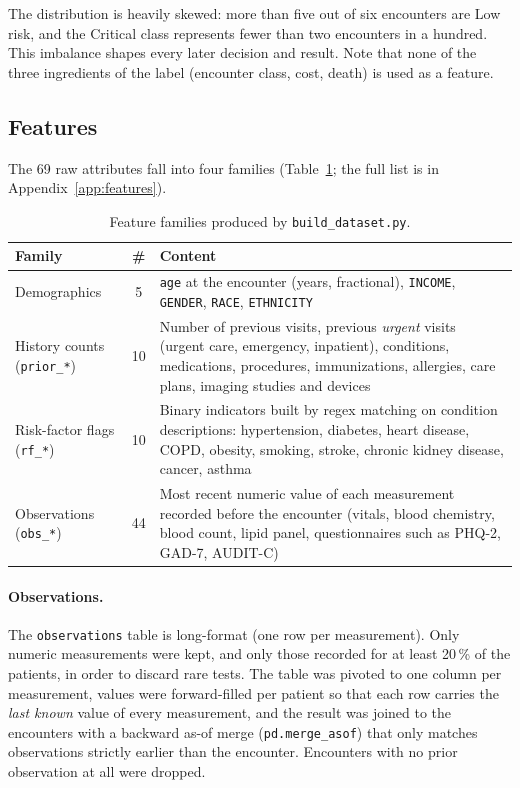 \documentclass[11pt,a4paper]{article}
\newcommand{\code}[1]{\texttt{\textcolor{codegrey}{#1}}}
\begin{document}
The distribution is heavily skewed: more than five out of six encounters are Low risk, and the
Critical class represents fewer than two encounters in a hundred. This imbalance shapes every later
decision and result. Note that none of the three ingredients of the label (encounter class, cost,
death) is used as a feature.

\subsection{Features}

The 69 raw attributes fall into four families (Table~\ref{tab:features}; the full list is in
Appendix~\ref{app:features}).

\begin{table}[H]
\centering\small
\caption{Feature families produced by \code{build\_dataset.py}.}
\label{tab:features}
\begin{tabular}{@{}lcp{8.6cm}@{}}
\toprule
\textbf{Family} & \textbf{\#} & \textbf{Content} \\
\midrule
Demographics & 5 & \code{age} at the encounter (years, fractional), \code{INCOME}, \code{GENDER}, \code{RACE}, \code{ETHNICITY} \\
History counts (\code{prior\_*}) & 10 & Number of previous visits, previous \emph{urgent} visits (urgent care, emergency, inpatient), conditions, medications, procedures, immunizations, allergies, care plans, imaging studies and devices \\
Risk-factor flags (\code{rf\_*}) & 10 & Binary indicators built by regex matching on condition descriptions: hypertension, diabetes, heart disease, COPD, obesity, smoking, stroke, chronic kidney disease, cancer, asthma \\
Observations (\code{obs\_*}) & 44 & Most recent numeric value of each measurement recorded before the encounter (vitals, blood chemistry, blood count, lipid panel, questionnaires such as PHQ-2, GAD-7, AUDIT-C) \\
\bottomrule
\end{tabular}
\end{table}

\paragraph{Observations.}
The \code{observations} table is long-format (one row per measurement). Only numeric
measurements were kept, and only those recorded for at least 20\,\% of the patients, in order to
discard rare tests. The table was pivoted to one column per measurement, values were
forward-filled per patient so that each row carries the \emph{last known} value of every
measurement, and the result was joined to the encounters with a backward as-of merge
(\code{pd.merge\_asof}) that only matches observations strictly earlier than the encounter.
Encounters with no prior observation at all were dropped.
\end{document}
